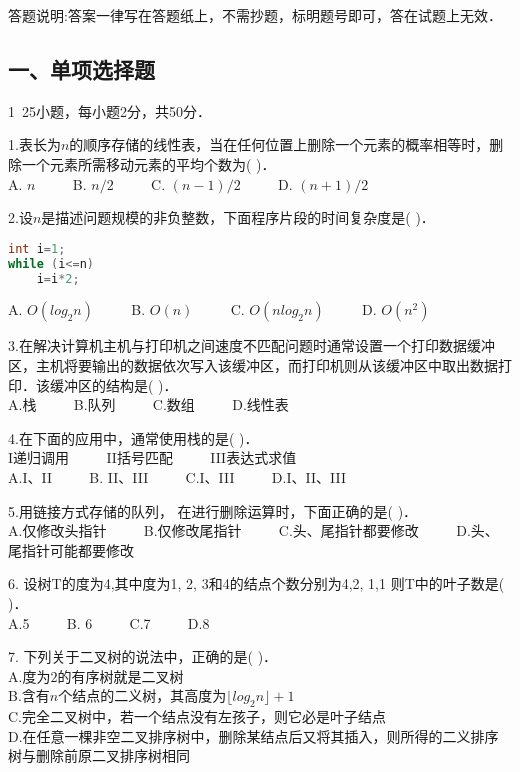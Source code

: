 

答题说明:答案一律写在答题纸上，不需抄题，标明题号即可，答在试题上无效．

\subsection{一、单项选择题}

1~25小题，每小题2分，共50分．

1.表长为$n$的顺序存储的线性表，当在任何位置上删除一个元素的概率相等时，删除一个元素所需移动元素的平均个数为(    )． \\
A. $n$ $\qquad$ B. $n/2$ $\qquad$ C. $(n-1)/2$ $\qquad$ D. $(n+1)/2$

2.设$n$是描述问题规模的非负整数，下面程序片段的时间复杂度是(    )． \\
\begin{lstlisting}[language=cpp]
int i=1;
while (i<=n)
    i=i*2;
\end{lstlisting}
A. $O(log_2n)$  $\qquad$  B. $O(n)$  $\qquad$  C. $O(nlog_2n)$  $\qquad$  D. $O(n^2)$

3.在解决计算机主机与打印机之间速度不匹配问题时通常设置一个打印数据缓冲区，主机将要输出的数据依次写入该缓冲区，而打印机则从该缓冲区中取出数据打印．该缓冲区的结构是(    )． \\
A.栈 $\qquad$ B.队列 $\qquad$ C.数组 $\qquad$ D.线性表

4.在下面的应用中，通常使用栈的是(    )． \\
I递归调用 $\qquad$ II括号匹配 $\qquad$ III表达式求值 $\qquad$ \\
A.I、II $\qquad$ B. II、III $\qquad$ C.I、III $\qquad$ D.I、II、III

5.用链接方式存储的队列， 在进行删除运算时，下面正确的是(    )． \\
A.仅修改头指针 $\qquad$ B.仅修改尾指针 $\qquad$ C.头、尾指针都要修改 $\qquad$ D.头、尾指针可能都要修改

6. 设树T的度为4,其中度为1, 2, 3和4的结点个数分别为4,2, 1,1 则T中的叶子数是(    )． \\
A.5 $\qquad$ B. 6 $\qquad$ C.7 $\qquad$ D.8

7. 下列关于二叉树的说法中，正确的是(    )． \\
A.度为$2$的有序树就是二叉树 \\
B.含有$n$个结点的二义树，其高度为$\lfloor log_2n \rfloor +1$ \\
C.完全二叉树中，若一个结点没有左孩子，则它必是叶子结点 \\
D.在任意一棵非空二叉排序树中，删除某结点后又将其插入，则所得的二义排序树与删除前原二叉排序树相同

